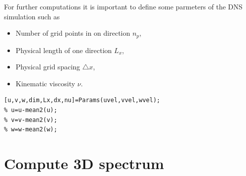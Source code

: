 \documentclass[preprint,12pt,ntfdMod]{elsarticle}
\begin{document}
\begin{par}

For further computations it is important to define some parmeters of the
DNS simulation such as
\begin{itemize}
  \item Number of grid points in on direction $n_{p}$,
  \item Physical length of one direction $L_x$,
  \item Physical grid spacing $\triangle x$,
  \item Kinematic viscosity $\nu$.
\end{itemize}

\end{par} \vspace{1em}
\begin{lstlisting}
[u,v,w,dim,Lx,dx,nu]=Params(uvel,vvel,wvel);
% u=u-mean2(u);
% v=v-mean2(v);
% w=w-mean2(w);
\end{lstlisting}
\begin{par}



\end{par} \vspace{1em}


\section{Compute 3D spectrum}
\end{document}
